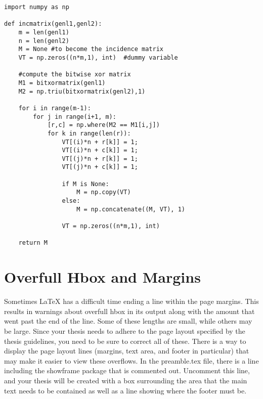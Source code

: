     \begin{lstlisting}[float=hb, caption=Example from Overleaf demonstrating python code using a monospaced font. The use of this font is important to see what statement the return lines up with, label=lst:OverleafCode]
import numpy as np

def incmatrix(genl1,genl2):
    m = len(genl1)
    n = len(genl2)
    M = None #to become the incidence matrix
    VT = np.zeros((n*m,1), int)  #dummy variable

    #compute the bitwise xor matrix
    M1 = bitxormatrix(genl1)
    M2 = np.triu(bitxormatrix(genl2),1)

    for i in range(m-1):
        for j in range(i+1, m):
            [r,c] = np.where(M2 == M1[i,j])
            for k in range(len(r)):
                VT[(i)*n + r[k]] = 1;
                VT[(i)*n + c[k]] = 1;
                VT[(j)*n + r[k]] = 1;
                VT[(j)*n + c[k]] = 1;

                if M is None:
                    M = np.copy(VT)
                else:
                    M = np.concatenate((M, VT), 1)

                VT = np.zeros((n*m,1), int)

    return M
    \end{lstlisting}

\section{Overfull Hbox and Margins}
    Sometimes LaTeX has a difficult time ending a line within the page margins.
    This results in warnings about overfull hbox in its output along with the amount that went past the end of the line.
    Some of these lengths are small, while others may be large.
    Since your thesis needs to adhere to the page layout specified by the thesis guidelines, you need to be sure to correct all of these.
    There is a way to display the page layout lines (margins, text area, and footer in particular) that may make it easier to view these overflows.
    In the preamble.tex file, there is a line including the showframe package that is commented out.
    Uncomment this line, and your thesis will be created with a box surrounding the area that the main text needs to be contained as well as a line showing where the footer must be.

